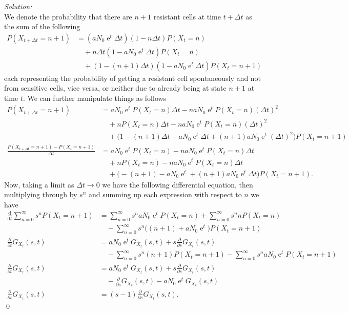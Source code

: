 \documentclass[10pt]{amsart}
\newcommand{\D}{\mathrm{d}}
\DeclareMathOperator{\E}{e}
\begin{document}
\noindent
\textit{Solution:} \\
We denote the probability that there are $n + 1$ resistant cells at time $t + \Delta t$ as the sum of the following
\begin{align*}
P(X_{t + \Delta t} = n + 1) &= (aN_0 \E^t\Delta t)(1 - n\Delta t)P(X_t = n) \\
	&\quad + n\Delta t(1 - aN_0 \E^t\Delta t)P(X_t = n) \\
	&\quad + (1 - (n + 1)\Delta t)(1 - aN_0 \E^t\Delta t)P(X_t = n + 1)
\end{align*}
each representing the probability of getting a resistant cell spontaneously and not from sensitive cells, vice versa, or neither due to already being at state $n + 1$ at time $t$.
We can further manipulate things as follows
\begin{align*}
P(X_{t + \Delta t} = n + 1)
	&= aN_0 \E^tP(X_t = n)\Delta t - naN_0 \E^tP(X_t = n)(\Delta t)^2 \\
	&\quad + nP(X_t = n)\Delta t - naN_0 \E^tP(X_t = n)(\Delta t)^2 \\
	&\quad + \big(1 - (n + 1)\Delta t - a N_0 \E^t\Delta t + (n + 1)a N_0 \E^t(\Delta t)^2\big)P(X_t = n + 1) \\
\frac {P(X_{t + \Delta t} = n + 1) - P(X_{t} = n + 1)}{\Delta t}
	&= aN_0 \E^tP(X_t = n) - naN_0 \E^tP(X_t = n)\Delta t \\
	&\quad + nP(X_t = n) - naN_0 \E^tP(X_t = n)\Delta t \\
	&\quad + \big( - (n + 1) - a N_0 \E^t + (n + 1)a N_0 \E^t\Delta t\big)P(X_t = n + 1).
\end{align*}
Now, taking a limit as $\Delta t \rightarrow 0$ we have the following differential equation, then multiplying through by $s^n$ and summing up each expression with respect to $n$ we have
\begin{align*}
\frac {\D }{\D t} \sum_{n = 0}^\infty s^n P(X_{t} = n + 1)
	&= \sum_{n = 0}^\infty s^naN_0 \E^tP(X_t = n) + \sum_{n = 0}^\infty s^nnP(X_t = n) \\
		&\quad - \sum_{n = 0}^\infty s^n\big( (n + 1) + a N_0 \E^t \big)P(X_t = n + 1) \\
\frac {\partial }{\partial t} G_{X_t}(s,t)
	&= aN_0 \E^tG_{X_t}(s,t) + s\frac {\partial }{\partial s} G_{X_t}(s,t) \\
		&\quad - \sum_{n = 0}^\infty s^n(n + 1) P(X_t = n + 1) - \sum_{n = 0}^\infty s^n a N_0 \E^t P(X_t = n + 1) \\
\frac {\partial }{\partial t} G_{X_t}(s,t)
	&= aN_0 \E^tG_{X_t}(s,t) + s\frac {\partial }{\partial s} G_{X_t}(s,t) \\
		&\quad - \frac {\partial }{\partial s} G_{X_t}(s,t) - aN_0 \E^tG_{X_t}(s,t) \\
\frac {\partial }{\partial t} G_{X_t}(s,t) &= (s - 1)\frac {\partial }{\partial s} G_{X_t}(s,t). 
\end{align*} \qed
\\
\end{document}
